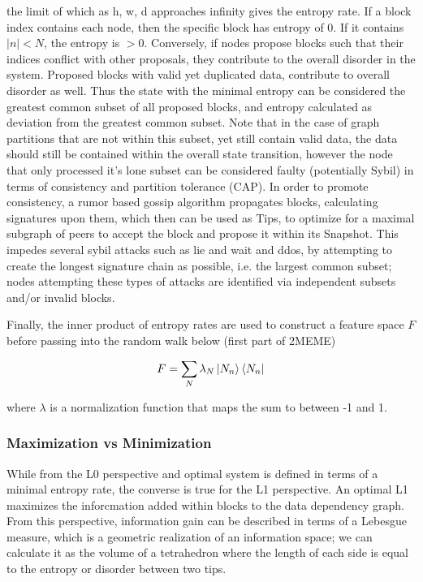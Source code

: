 \documentclass{article}
\begin{document}
	the limit of which as h, w, d approaches infinity gives the entropy rate.
If a block index contains each node, then the specific block has entropy of 0. If it contains $|n| < N$, the entropy is $> 0$. Conversely, if nodes propose blocks such that their indices conflict with other proposals, they contribute to the overall disorder in the system. Proposed blocks with valid yet duplicated data, contribute to overall disorder as well. Thus the state with the minimal entropy can be considered the greatest common subset of all proposed blocks, and entropy calculated as deviation from the greatest common subset. Note that in the case of graph partitions that are not within this subset, yet still contain valid data, the data should still be contained within the overall state transition, however the node that only processed it’s lone subset can be considered faulty (potentially Sybil) in terms of consistency and partition tolerance (CAP). In order to promote consistency, a rumor based gossip algorithm propagates blocks, calculating signatures upon them, which then can be used as Tips, to optimize for a maximal subgraph of peers to accept the block and propose it within its Snapshot. This impedes several sybil attacks such as lie and wait and ddos, by attempting to create the longest signature chain as possible, i.e. the largest common subset; nodes attempting these types of attacks are identified via independent subsets and/or invalid blocks.

Finally, the inner product of entropy rates are used to construct a feature space $F$ before passing into the random walk below (first part of 2MEME)

\begin{equation}
F = \sum_N \lambda_N \ket{N_n} \bra{N_n}
\end{equation}

where $\lambda$ is a normalization function that maps the sum to between -1 and 1.

\subsubsection{Maximization vs Minimization}
While from the L0 perspective and optimal system is defined in terms of a minimal entropy rate, the converse is true for the L1 perspective. An optimal L1 maximizes the inforcmation added within blocks to the data dependency graph. From this perspective, information gain can be described in terms of a Lebesgue measure, which is a geometric realization of an information space; we can calculate it as the volume of a tetrahedron where the length of each side is equal to the entropy or disorder between two tips. 
\end{document}

